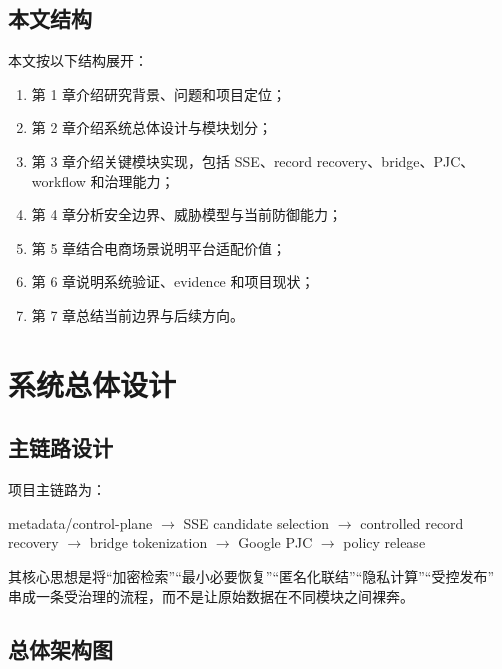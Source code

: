 \documentclass[UTF8,a4paper,12pt,oneside]{ctexrep}
\newcommand{\pipeline}{metadata/control-plane $\rightarrow$ SSE candidate selection $\rightarrow$ controlled record recovery $\rightarrow$ bridge tokenization $\rightarrow$ Google PJC $\rightarrow$ policy release}
\begin{document}
\section{本文结构}

本文按以下结构展开：

\begin{enumerate}
  \item 第 1 章介绍研究背景、问题和项目定位；
  \item 第 2 章介绍系统总体设计与模块划分；
  \item 第 3 章介绍关键模块实现，包括 SSE、record recovery、bridge、PJC、workflow 和治理能力；
  \item 第 4 章分析安全边界、威胁模型与当前防御能力；
  \item 第 5 章结合电商场景说明平台适配价值；
  \item 第 6 章说明系统验证、evidence 和项目现状；
  \item 第 7 章总结当前边界与后续方向。
\end{enumerate}

\chapter{系统总体设计}

\section{主链路设计}

项目主链路为：

\begin{center}
\pipeline
\end{center}

其核心思想是将“加密检索”“最小必要恢复”“匿名化联结”“隐私计算”“受控发布”
串成一条受治理的流程，而不是让原始数据在不同模块之间裸奔。

\section{总体架构图}
\end{document}
